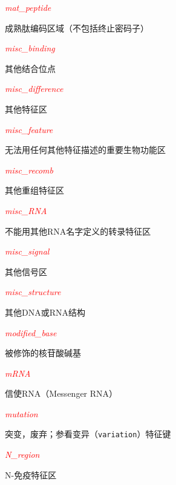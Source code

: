 \textcolor{red}{\textit{mat\_peptide}}
\begin{adjustwidth}{1cm}{}
成熟肽编码区域（不包括终止密码子）
\end{adjustwidth}

\textcolor{red}{\textit{misc\_binding}}
\begin{adjustwidth}{1cm}{}
其他结合位点
\end{adjustwidth}

\textcolor{red}{\textit{misc\_difference}}
\begin{adjustwidth}{1cm}{}
其他特征区
\end{adjustwidth}

\textcolor{red}{\textit{misc\_feature}}
\begin{adjustwidth}{1cm}{}
无法用任何其他特征描述的重要生物功能区
\end{adjustwidth}

\textcolor{red}{\textit{misc\_recomb}}
\begin{adjustwidth}{1cm}{}
其他重组特征区
\end{adjustwidth}

\textcolor{red}{\textit{misc\_RNA}}
\begin{adjustwidth}{1cm}{}
不能用其他RNA名字定义的转录特征区
\end{adjustwidth}

\textcolor{red}{\textit{misc\_signal}}
\begin{adjustwidth}{1cm}{}
其他信号区
\end{adjustwidth}

\textcolor{red}{\textit{misc\_structure}}
\begin{adjustwidth}{1cm}{}
其他DNA或RNA结构
\end{adjustwidth}

\textcolor{red}{\textit{modified\_base}}
\begin{adjustwidth}{1cm}{}
被修饰的核苷酸碱基
\end{adjustwidth}

\textcolor{red}{\textit{mRNA}}
\begin{adjustwidth}{1cm}{}
信使RNA（Messenger RNA）
\end{adjustwidth}

\textcolor{red}{\textit{mutation}}
\begin{adjustwidth}{1cm}{}
突变，废弃；参看变异（\verb|variation|）特征键
\end{adjustwidth}

\textcolor{red}{\textit{N\_region}}
\begin{adjustwidth}{1cm}{}
N-免疫特征区
\end{adjustwidth}

